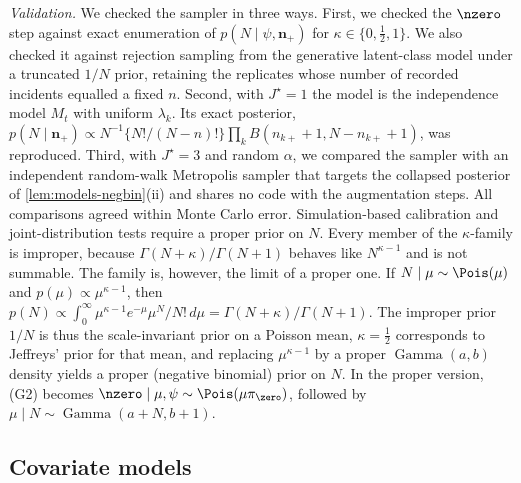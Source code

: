 \emph{Validation.} We checked the sampler in three ways. First, we checked the $\nzero$ step against exact enumeration of $p(N\mid\psi,\bm n_+)$ for $\kappa\in\{0,\tfrac12,1\}$. We also checked it against rejection sampling from the generative latent-class model under a truncated $1/N$ prior, retaining the replicates whose number of recorded incidents equalled a fixed $n$. Second, with $J^\star=1$ the model is the independence model $M_t$ with uniform $\lambda_k$. Its exact posterior, $p(N\mid\bm n_+)\propto N^{-1}\{N!/(N-n)!\}\prod_kB(n_{k+}+1,N-n_{k+}+1)$, was reproduced. Third, with $J^\star=3$ and random $\alpha$, we compared the sampler with an independent random-walk Metropolis sampler that targets the collapsed posterior of \cref{lem:models-negbin}(ii) and shares no code with the augmentation steps. All comparisons agreed within Monte Carlo error. Simulation-based calibration \citep{talts2018} and joint-distribution tests \citep{geweke2004} require a proper prior on $N$. Every member of the $\kappa$-family is improper, because $\Gamma(N+\kappa)/\Gamma(N+1)$ behaves like $N^{\kappa-1}$ and is not summable. The family is, however, the limit of a proper one. If $N\mid\mu\sim\Pois(\mu)$ and $p(\mu)\propto\mu^{\kappa-1}$, then $p(N)\propto\int_0^\infty\mu^{\kappa-1}e^{-\mu}\mu^N/N!\,d\mu=\Gamma(N+\kappa)/\Gamma(N+1)$. The improper prior $1/N$ is thus the scale-invariant prior on a Poisson mean, $\kappa=\tfrac12$ corresponds to Jeffreys' prior for that mean, and replacing $\mu^{\kappa-1}$ by a proper $\operatorname{Gamma}(a,b)$ density yields a proper (negative binomial) prior on $N$. In the proper version, (G2) becomes $\nzero\mid\mu,\psi\sim\Pois(\mu\pi_{\zero})$, followed by $\mu\mid N\sim\operatorname{Gamma}(a+N,b+1)$.

\subsection{Covariate models}\label{app:comp-cov}


